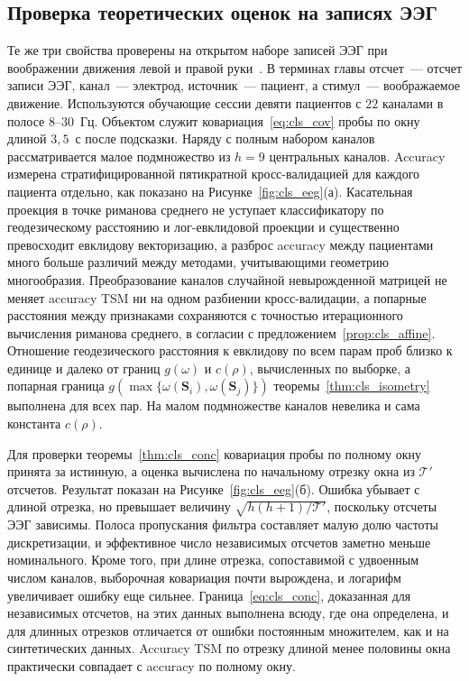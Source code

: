 \subsection{Проверка теоретических оценок на записях ЭЭГ}\label{sec4:cls_eeg}

Те же три свойства проверены на открытом наборе записей ЭЭГ при воображении движения левой и правой руки~\cite{tangermann2012review}. В терминах главы отсчет~--- отсчет записи ЭЭГ, канал~--- электрод, источник~--- пациент, а стимул~--- воображаемое движение. Используются обучающие сессии девяти пациентов с $22$ каналами в полосе $8$--$30$~Гц. Объектом служит ковариация~\eqref{eq:cls_cov} пробы по окну длиной $3{,}5$~с после подсказки. Наряду с полным набором каналов рассматривается малое подмножество из $h = 9$ центральных каналов. Accuracy измерена стратифицированной пятикратной кросс-валидацией для каждого пациента отдельно, как показано на Рисунке~\ref{fig:cls_eeg}(а). Касательная проекция в точке риманова среднего не уступает классификатору по геодезическому расстоянию и лог-евклидовой проекции и существенно превосходит евклидову векторизацию, а разброс accuracy между пациентами много больше различий между методами, учитывающими геометрию многообразия. Преобразование каналов случайной невырожденной матрицей не меняет accuracy TSM ни на одном разбиении кросс-валидации, а попарные расстояния между признаками сохраняются с точностью итерационного вычисления риманова среднего, в согласии с предложением~\ref{prop:cls_affine}. Отношение геодезического расстояния к евклидову по всем парам проб близко к единице и далеко от границ $g(\omega)$ и $c(\rho)$, вычисленных по выборке, а попарная граница $g(\max\{\omega(\mathbf{S}_i), \omega(\mathbf{S}_j)\})$ теоремы~\ref{thm:cls_isometry} выполнена для всех пар. На малом подмножестве каналов невелика и сама константа $c(\rho)$.

Для проверки теоремы~\ref{thm:cls_conc} ковариация пробы по полному окну принята за истинную, а оценка вычислена по начальному отрезку окна из $\mathcal{T}'$ отсчетов. Результат показан на Рисунке~\ref{fig:cls_eeg}(б). Ошибка убывает с длиной отрезка, но превышает величину $\sqrt{h(h+1)/\mathcal{T}'}$, поскольку отсчеты ЭЭГ зависимы. Полоса пропускания фильтра составляет малую долю частоты дискретизации, и эффективное число независимых отсчетов заметно меньше номинального. Кроме того, при длине отрезка, сопоставимой с удвоенным числом каналов, выборочная ковариация почти вырождена, и логарифм увеличивает ошибку еще сильнее. Граница~\eqref{eq:cls_conc}, доказанная для независимых отсчетов, на этих данных выполнена всюду, где она определена, и для длинных отрезков отличается от ошибки постоянным множителем, как и на синтетических данных. Accuracy TSM по отрезку длиной менее половины окна практически совпадает с accuracy по полному окну.


